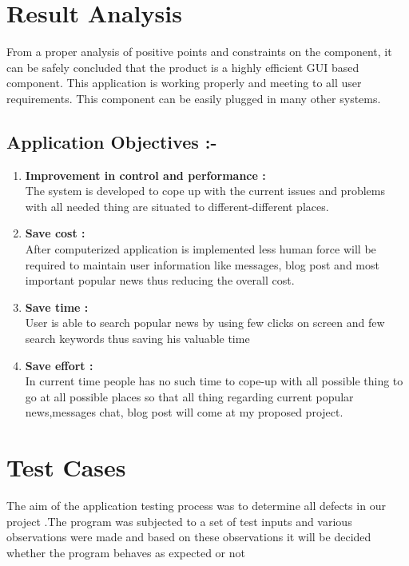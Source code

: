 \noindent
\section{Result Analysis}
From a proper analysis of positive points and constraints on the component, it can be safely concluded that the product is a highly efficient GUI based component. This application is working properly and meeting to all user requirements. This component can be easily plugged in many other systems.

\subsection{Application Objectives :- }

\begin{enumerate}
	\setlength{\itemsep}{-0.3em}
	\item  \textbf{Improvement in control and performance :}\\ The system is developed to cope up with the current issues and problems with all needed thing are situated to different-different places.
	\item  \textbf{Save cost :}\\ After computerized application is implemented less human force will be required to maintain user information like messages, blog post and most important popular news thus reducing the overall cost.\\
	\item \textbf{Save time :}\\ User is able to search popular news by using few clicks on screen and few search keywords thus saving his valuable time\\
	\item \textbf{Save effort :}\\ In current time people has no such time to cope-up with all possible thing to go at all possible places so that all thing regarding current popular news,messages chat, blog post will come at my proposed project. 
\end{enumerate}


\section{Test Cases}
The aim of the application testing process was to determine all defects in our project .The program was subjected to a set of test inputs and various observations were made and based on these observations it will be decided whether the program behaves as expected or not

